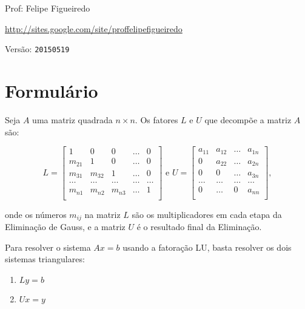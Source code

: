 \documentclass[a4paper]{article}
\begin{document}
\parbox[c]{.825\textwidth}{\raggedright%
{Prof: Felipe Figueiredo\par}
{\url{http://sites.google.com/site/proffelipefigueiredo}\par}
}

Versão: \verb|20150519|



\section{Formulário}

Seja $A$ uma matriz quadrada $n \times n$. Os fatores $L$ e $U$ que
decompõe a matriz $A$ são:

\begin{displaymath}
  L=\begin{bmatrix}
    1 & 0 & 0 & \ldots & 0\\
    m_{21} & 1 & 0 & \ldots & 0\\
    m_{31} & m_{32} & 1 & \ldots & 0\\
    \ldots & \ldots & \ldots  & \ldots  &\ldots  \\
    m_{n1} & m_{n2} & m_{n3} & \ldots & 1\\
  \end{bmatrix} \text{ e }   U=\begin{bmatrix}
    a_{11} & a_{12} & \ldots & a_{1n}\\
    0 & a_{22} & \ldots & a_{2n}\\
    0 & 0 & \ldots & a_{3n}\\
    \ldots & \ldots & \ldots & \ldots \\
    0 &   \ldots & 0 & a_{nn}\\
  \end{bmatrix},
\end{displaymath}

onde os números $m_{ij}$ na matriz $L$ são os multiplicadores em cada etapa da
Eliminação de Gauss, e a matriz $U$ é o resultado final da Eliminação.

Para resolver o sistema $Ax=b$ usando a fatoração LU, basta resolver
os dois sistemas triangulares:
\begin{enumerate}
\item $Ly=b$
\item $Ux=y$
\end{enumerate}
\end{document}
